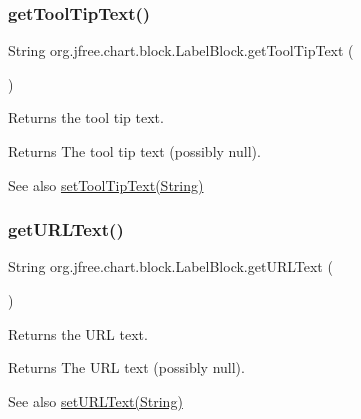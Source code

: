 \subsubsection{\texorpdfstring{get\+Tool\+Tip\+Text()}{getToolTipText()}}
{\footnotesize\ttfamily String org.\+jfree.\+chart.\+block.\+Label\+Block.\+get\+Tool\+Tip\+Text (\begin{DoxyParamCaption}{ }\end{DoxyParamCaption})}

Returns the tool tip text.

\begin{DoxyReturn}{Returns}
The tool tip text (possibly {\ttfamily null}).
\end{DoxyReturn}
\begin{DoxySeeAlso}{See also}
\mbox{\hyperlink{classorg_1_1jfree_1_1chart_1_1block_1_1_label_block_a5246d7e339b69d4a5da629b28118e95e}{set\+Tool\+Tip\+Text(\+String)}} 
\end{DoxySeeAlso}
\mbox{\label{classorg_1_1jfree_1_1chart_1_1block_1_1_label_block_a79574c2d0dfe0ac5407e20f96abce42b}} 
\subsubsection{\texorpdfstring{get\+U\+R\+L\+Text()}{getURLText()}}
{\footnotesize\ttfamily String org.\+jfree.\+chart.\+block.\+Label\+Block.\+get\+U\+R\+L\+Text (\begin{DoxyParamCaption}{ }\end{DoxyParamCaption})}

Returns the U\+RL text.

\begin{DoxyReturn}{Returns}
The U\+RL text (possibly {\ttfamily null}).
\end{DoxyReturn}
\begin{DoxySeeAlso}{See also}
\mbox{\hyperlink{classorg_1_1jfree_1_1chart_1_1block_1_1_label_block_a4897e250d1de9464ecdab9ced2b6aa5d}{set\+U\+R\+L\+Text(\+String)}} 
\end{DoxySeeAlso}
\mbox{\label{classorg_1_1jfree_1_1chart_1_1block_1_1_label_block_af5bf205b73126ccbc3f8c30550aa4112}} 
